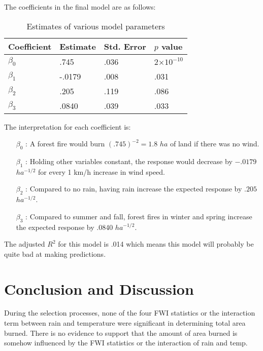 \documentclass[11pt]{report}
\newcommand{\e}[1]{\ensuremath{\times 10^{#1}}}
\begin{document}
The coefficients in the final model are as follows:
\begin{table}[!htb]
\begin{center}
    \begin{tabular}{llll}
    \hline
	Coefficient & Estimate & Std. Error & $p$ value \\ \hline
	$\beta_0$ & .745 & .036  & 2\e{-10}\\
	$\beta_1$ & -.0179 &.008 & .031\\
	$\beta_2$ & .205 & .119 &.086\\
	$\beta_3$ & .0840& .039 & .033\\
	\hline 
    \end{tabular}
		\caption {Estimates of various model parameters}
\end{center}
\end{table}

\noindent The interpretation for each coefficient is:
\begin{itemize}
\item[$\beta_0$]: A forest fire would burn $(.745)^{-2} = 1.8$ $ha$ of land if there was no wind.

\item[$\beta_1$]: Holding other variables constant, the response would decrease by $-.0179$ $ha^{-1/2}$ for every 1 km/h increase in wind speed.

\item[$\beta_2$]: Compared to no rain, having rain increase the expected response by $.205$ $ha^{-1/2}$.

\item[$\beta_3$]: Compared to summer and fall, forest fires in winter and spring increase the expected response by .0840 $ha^{-1/2}$.
\end{itemize}

\noindent The adjusted $R^2$ for this model is .014 which means this model will probably be quite bad at making predictions.





\section*{Conclusion and Discussion}
During the selection processes, none of the four FWI statistics or the interaction term between rain and temperature were significant in determining total area burned. There is no evidence to support that the amount of area burned is somehow influenced by the FWI statistics or the interaction of rain and temp. 
\end{document}
